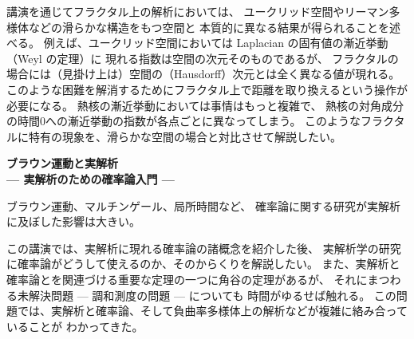 \documentclass[uplatex,dvipdfmx]{jlreq}
\begin{document}
講演を通じてフラクタル上の解析においては、
ユークリッド空間やリーマン多様体などの滑らかな構造をもつ空間と
本質的に異なる結果が得られることを述べる。
例えば、ユークリッド空間においては Laplacian の固有値の漸近挙動（Weyl の定理）に
現れる指数は空間の次元そのものであるが、
フラクタルの場合には（見掛け上は）空間の（Hausdorff）次元とは全く異なる値が現れる。
このような困難を解消するためにフラクタル上で距離を取り換えるという操作が必要になる。
熱核の漸近挙動においては事情はもっと複雑で、
熱核の対角成分の時間0への漸近挙動の指数が各点ごとに異なってしまう。
このようなフラクタルに特有の現象を、滑らかな空間の場合と対比させて解説したい。

\newpage

\begin{center}
  {\large\bfseries ブラウン運動と実解析\\
  \normalsize --- 実解析のための確率論入門 ---}
\end{center}

\bigskip
\hspace*{\fill}{\large\bfseries 新井　仁之（東大・数理）}

\bigskip

ブラウン運動、マルチンゲール、局所時間など、
確率論に関する研究が実解析に及ぼした影響は大きい。

この講演では、実解析に現れる確率論の諸概念を紹介した後、
実解析学の研究に確率論がどうして使えるのか、そのからくりを解説したい。
また、実解析と確率論とを関連づける重要な定理の一つに角谷の定理があるが、
それにまつわる未解決問題 --- 調和測度の問題 --- についても
時間がゆるせば触れる。
この問題では、実解析と確率論、そして負曲率多様体上の解析などが複雑に絡み合っていることが
わかってきた。
\end{document}
